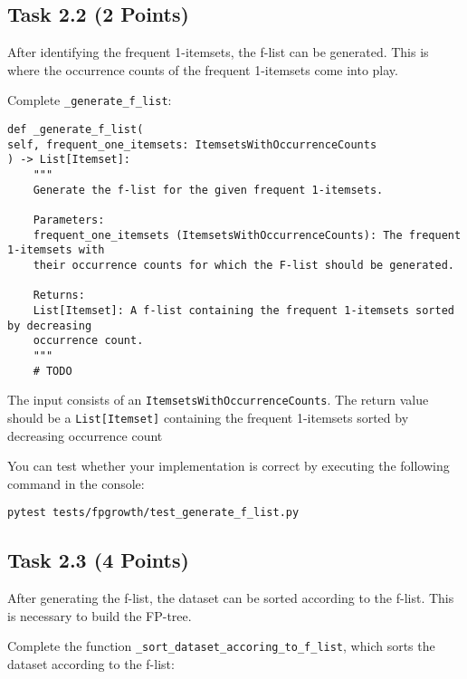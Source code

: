 \documentclass[
english,
smallborders
]{i6prcsht}
\newcommand{\points}[1]{\hfill \color{red}(#1 Points)\color{black}}
\begin{document}
\subsection*{Task 2.2 \points{2}}

After identifying the frequent 1-itemsets, the f-list can be generated. This is where the occurrence counts of the frequent 1-itemsets come into play.

Complete \texttt{\_generate\_f\_list}:

\vspace*{0.3cm}

\begin{lstlisting}
def _generate_f_list(
self, frequent_one_itemsets: ItemsetsWithOccurrenceCounts
) -> List[Itemset]:
	"""
	Generate the f-list for the given frequent 1-itemsets.

	Parameters:
	frequent_one_itemsets (ItemsetsWithOccurrenceCounts): The frequent 1-itemsets with
	their occurrence counts for which the F-list should be generated.

	Returns:
	List[Itemset]: A f-list containing the frequent 1-itemsets sorted by decreasing
	occurrence count.
	"""
	# TODO
\end{lstlisting}

\vspace*{0.1cm}

The input consists of an \texttt{ItemsetsWithOccurrenceCounts}. The return value should be a \texttt{List[Itemset]} containing the frequent 1-itemsets sorted by decreasing occurrence count

You can test whether your implementation is correct by executing the following command in the console:

\vspace*{0.3cm}

\begin{lstlisting}
pytest tests/fpgrowth/test_generate_f_list.py
\end{lstlisting}

\vspace*{0.1cm}

\subsection*{Task 2.3 \points{4}}

After generating the f-list, the dataset can be sorted according to the f-list. This is necessary to build the FP-tree.

Complete the function \texttt{\_sort\_dataset\_accoring\_to\_f\_list}, which sorts the dataset according to the f-list:
\end{document}
